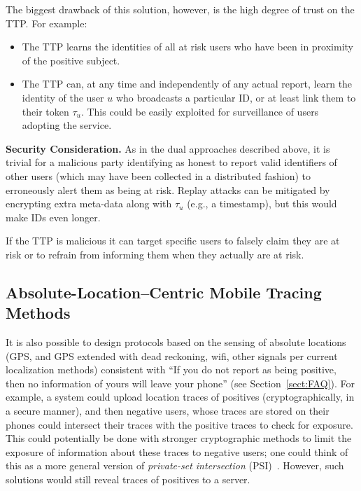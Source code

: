 The biggest drawback of this solution, however, is the high degree of trust on the TTP. For example:
\begin{itemize}
    \item The TTP learns the identities of all at risk users who have been in proximity of the positive subject.  
    \item The TTP can, at any time and independently of any actual report, learn the identity of the user $u$ who broadcasts a particular ID, or at least link them to their token $\tau_u$. This could be easily exploited for surveillance of users adopting the service.
\end{itemize}

{\bf Security Consideration.} As in the dual approaches described above, it is trivial for a malicious party identifying as honest to report valid identifiers of other users (which may have been collected in a distributed fashion) to erroneously alert them as being at risk. Replay attacks can be mitigated by encrypting extra meta-data along with $\tau_u$ (e.g., a timestamp), but this would make IDs even longer.

If the TTP is malicious it can target specific users to falsely claim they are at risk or to refrain from informing them when they actually are at risk.


\subsection{Absolute-Location--Centric Mobile Tracing Methods}\label{sect:GPS}
It is also possible to design protocols based on the sensing of absolute locations (GPS, and GPS extended with dead reckoning, wifi, other signals per current localization methods) consistent with ``If you do not report as being positive, then no information of yours will leave your phone'' (see Section~\ref{sect:FAQ}).  For example, a system could upload location traces of positives (cryptographically, in a secure manner), and then negative users, whose traces are stored on their phones could intersect their traces with the positive traces to check for exposure. This could potentially be done with stronger cryptographic methods to limit the exposure of information about these traces to negative users; one could think of this as a more general version of {\em private-set intersection} (PSI)~\cite{PSI,PSI2,PSI3}. However, such solutions would still reveal traces of positives to a server.  

